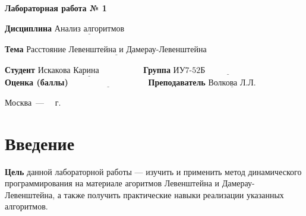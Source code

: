 \documentclass[a4paper,12pt]{article}
\begin{document}
\begin{center}
	\Large\textbf{Лабораторная работа № 1}
\end{center}

\vspace{\baselineskip}
\noindent\textbf{Дисциплина} $\underline{\text{Анализ алгоритмов}}$

\vspace{\baselineskip}
\noindent\textbf{Тема} $\underline{\text{Расстояние Левенштейна и Дамерау-Левенштейна}}$

\vspace{\baselineskip}
\noindent\textbf{Студент} $\underline{\text{Искакова Карина~~~~~~~~~~~~~~~}}$\newline\newline
\noindent\textbf{Группа} $\underline{\text{ИУ7-52Б~~~~~~~~~~~~~~~~~~~~~~~~~~~~}}$\newline\newline
\noindent\textbf{Оценка (баллы)} $\underline{\text{~~~~~~~~~~~~~~~~~~~~~~~~~~~}}$\newline\newline
\noindent\textbf{Преподаватель} $\underline{\text{Волкова Л.Л.}}$\newline
	
\begin{center}
	\vfill
	Москва~---~\the\year
~г.
\end{center}
\clearpage

\begin{center}
\tableofcontents
\end{center}
\clearpage

\section*{Введение}
\vspace{\baselineskip}


\textbf{Цель} данной лабораторной работы — изучить и применить метод динамического программирования на материале агоритмов Левенштейна и Дамерау-Левенштейна, а также получить практические навыки реализации указанных алгоритмов.\newline
\end{document}
